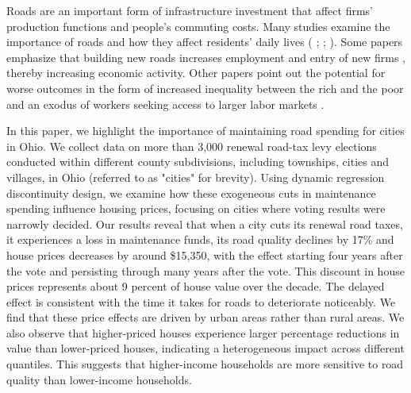 Roads are an important form of infrastructure investment that affect firms’ production functions and people’s commuting costs. Many studies examine the importance of roads and how they affect residents' daily lives ( \citeyear{currier2023};  \citeyear{adukia2020};  \citeyear{asher2020}). Some papers emphasize that building new roads increases employment and entry of new firms \citep{gibbons2019new}, thereby increasing economic activity. Other papers point out the potential for worse outcomes in the form of increased inequality between the rich and the poor \citep{hettige2006} and an exodus of workers seeking access to larger labor markets \citep{asher2020}.  
 
In this paper, we highlight the importance of maintaining road spending for cities in Ohio. We collect data on more than 3,000 renewal road-tax levy elections conducted within different county subdivisions, including townships, cities and villages, in Ohio (referred to as "cities" for brevity). Using dynamic regression discontinuity design, we examine how these exogeneous cuts in maintenance spending influence housing prices, focusing on cities where voting results were narrowly decided. Our results reveal that when a city cuts its renewal road taxes, it experiences a loss in maintenance funds, its road quality declines by 17\% and house prices decreases by around \$15,350, with the effect starting four years after the vote and persisting through many years after the vote. This discount in house prices represents about 9 percent of house value over the decade. The delayed effect is consistent with the time it takes for roads to deteriorate noticeably. We find that these price effects are driven by urban areas rather than rural areas. We also observe that higher-priced houses experience larger percentage reductions in value than lower-priced houses, indicating a heterogeneous impact across different quantiles. This suggests that higher-income households are more sensitive to road quality than lower-income households. 


